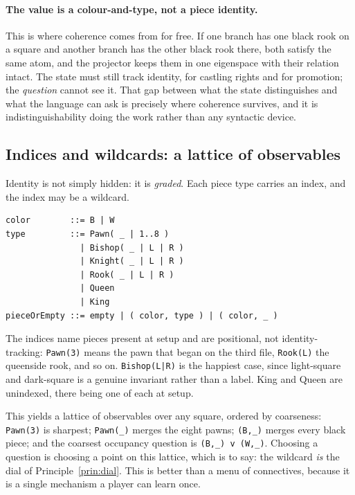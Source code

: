 \documentclass[11pt,a4paper]{article}
\theoremstyle{definition}
\theoremstyle{plain}
\begin{document}
\paragraph{The value is a colour-and-type, not a piece identity.}
This is where coherence comes from for free. If one branch has one black rook
on a square and another branch has the other black rook there, both satisfy the
same atom, and the projector keeps them in one eigenspace with their relation
intact. The state must still track identity, for castling rights and for
promotion; the \emph{question} cannot see it. That gap between what the state
distinguishes and what the language can ask is precisely where coherence
survives, and it is indistinguishability doing the work rather than any
syntactic device.

\subsection{Indices and wildcards: a lattice of observables}

Identity is not simply hidden: it is \emph{graded}. Each piece type carries an
index, and the index may be a wildcard.

\begin{lstlisting}
color        ::= B | W
type         ::= Pawn( _ | 1..8 )
               | Bishop( _ | L | R )
               | Knight( _ | L | R )
               | Rook( _ | L | R )
               | Queen
               | King
pieceOrEmpty ::= empty | ( color, type ) | ( color, _ )
\end{lstlisting}

The indices name pieces present at setup and are positional, not
identity-tracking: \texttt{Pawn(3)} means the pawn that began on the third
file, \texttt{Rook(L)} the queenside rook, and so on. \texttt{Bishop(L|R)} is
the happiest case, since light-square and dark-square is a genuine invariant
rather than a label. King and Queen are unindexed, there being one of each at
setup.

This yields a lattice of observables over any square, ordered by coarseness:
\texttt{Pawn(3)} is sharpest; \texttt{Pawn(\_)} merges the eight pawns;
\texttt{(B,\_)} merges every black piece; and the coarsest occupancy question
is \texttt{(B,\_) v (W,\_)}. Choosing a question is choosing a point on this
lattice, which is to say: the wildcard \emph{is} the dial of
Principle~\ref{prin:dial}. This is better than a menu of connectives, because
it is a single mechanism a player can learn once.
\end{document}
